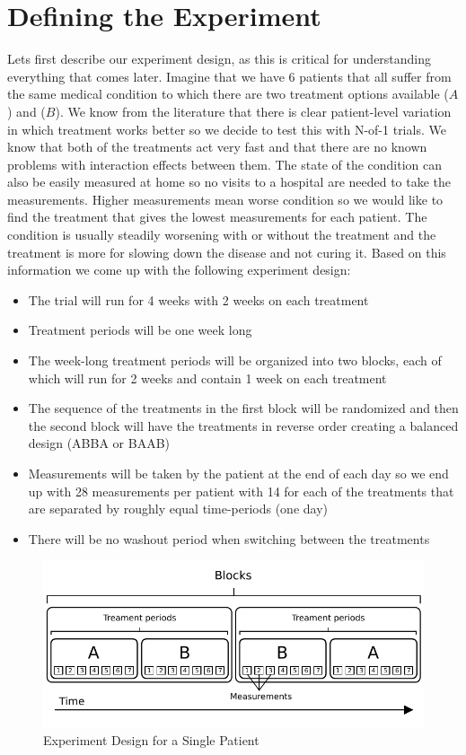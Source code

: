 \documentclass[12pt,a4paper,leqno]{report}
\theoremstyle{plain}
\theoremstyle{definition}
\theoremstyle{remark}
\begin{document}
\section{Defining the Experiment}

Lets first describe our experiment design, as this is critical for understanding
everything that comes later. Imagine that we have 6 patients that all suffer from the
same medical condition to which there are two treatment options available (\(A\)) and
(\(B\)). We know from the
literature that there is clear patient-level variation in which treatment works better
so we decide to test this with N-of-1 trials. We know that both of the treatments act
very fast and that there are no known problems with interaction effects between them.
The state of the condition can also be easily measured at home so no visits to
a hospital are needed to take the measurements. Higher measurements mean worse condition
so we would like to find the treatment that gives the lowest measurements for each patient. The condition is usually steadily
worsening with or without the treatment and the treatment is more for slowing down the
disease and not curing it. Based on this information we come up with the following experiment design:

\begin{itemize}
    \item The trial will run for 4 weeks with 2 weeks on each treatment
    \item Treatment periods will be one week long
    \item The week-long treatment periods will be organized into two blocks, each of which will run for
    2 weeks and contain 1 week on each treatment
    \item The sequence of the treatments in the first block will be randomized and then
    the second block will have the treatments in reverse order creating a balanced
    design (ABBA or BAAB)
    \item Measurements will be taken by the patient at the end of each day so we end up with
    28 measurements per patient with 14 for each of the treatments that are separated by
    roughly equal time-periods (one day)
    \item There will be no washout period when switching between the treatments
\end{itemize}

\begin{figure}[H]
    \centering
    \caption{Experiment Design for a Single Patient}\label{singlepatientexperimentdesign}
    \includegraphics{design_for_simulated_experiment.pdf}
\end{figure}
\end{document}
